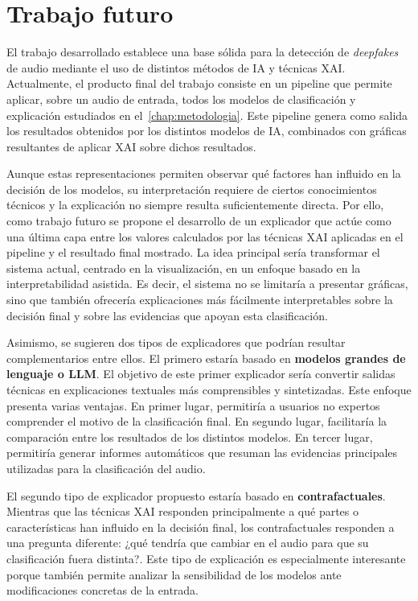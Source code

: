 \section{Trabajo futuro}

El trabajo desarrollado establece una base sólida para la detección de \textit{deepfakes} de audio mediante el uso de distintos métodos de IA y técnicas XAI.
Actualmente, el producto final del trabajo consiste en un pipeline que permite aplicar, sobre un audio de entrada, todos los modelos de clasificación y explicación estudiados en el~\autoref{chap:metodologia}. Este pipeline genera como salida los resultados obtenidos por los distintos modelos de IA, combinados con gráficas resultantes de aplicar XAI sobre dichos resultados.

Aunque estas representaciones permiten observar qué factores han influido en la decisión de los modelos, su interpretación requiere de ciertos conocimientos técnicos y la explicación no siempre resulta suficientemente directa. Por ello, como trabajo futuro se propone el desarrollo de un explicador que actúe como una última capa entre los valores calculados por las técnicas XAI aplicadas en el pipeline y el resultado final mostrado.
La idea principal sería transformar el sistema actual, centrado en la visualización, en un enfoque basado en la interpretabilidad asistida. Es decir, el sistema no se limitaría a presentar gráficas, sino que también ofrecería explicaciones más fácilmente interpretables sobre la decisión final y sobre las evidencias que apoyan esta clasificación.

Asimismo, se sugieren dos tipos de explicadores que podrían resultar complementarios entre ellos. El primero estaría basado en \textbf{modelos grandes de lenguaje o LLM}. El objetivo de este primer explicador sería convertir salidas técnicas en explicaciones textuales más comprensibles y sintetizadas. Este enfoque presenta varias ventajas. En primer lugar, permitiría a usuarios no expertos comprender el motivo de la clasificación final. En segundo lugar, facilitaría la comparación entre los resultados de los distintos modelos.
En tercer lugar, permitiría generar informes automáticos que resuman las evidencias principales utilizadas para la clasificación del audio.

El segundo tipo de explicador propuesto estaría basado en \textbf{contrafactuales}. Mientras que las técnicas XAI responden principalmente a qué partes o características han influido en la decisión final, los contrafactuales responden a una pregunta diferente: ¿qué tendría que cambiar en el audio para que su clasificación fuera distinta?.
Este tipo de explicación es especialmente interesante porque también permite analizar la sensibilidad de los modelos ante modificaciones concretas de la entrada.

